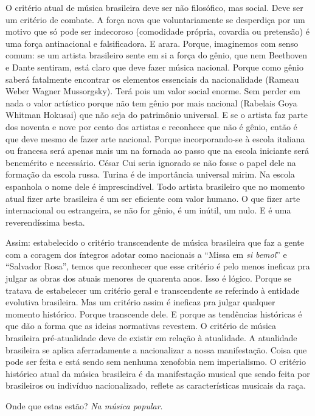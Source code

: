 O critério atual de música brasileira deve ser não filosófico, mas
social. Deve ser um critério de combate. A força nova que
voluntariamente se desperdiça por um motivo que só pode ser indecoroso
(comodidade própria, covardia ou pretensão) é uma força antinacional e
falsificadora. E arara. Porque, imaginemos com senso comum: se um
artista brasileiro sente em si a força do gênio, que nem Beethoven e
Dante sentiram, está claro que deve fazer música nacional. Porque como
gênio saberá fatalmente encontrar os elementos essenciais da
nacionalidade (Rameau Weber Wagner Mussorgsky). Terá pois um valor
social enorme. Sem perder em nada o valor artístico porque não tem gênio
por mais nacional (Rabelais Goya Whitman Hokusai) que não seja do
patrimônio universal. E se o artista faz parte dos noventa e nove por cento dos
artistas e reconhece que não é gênio, então é que deve mesmo de fazer
arte nacional. Porque incorporando-se à escola italiana ou francesa será
apenas mais um na fornada ao passo que na escola iniciante será
benemérito e necessário. César Cui seria ignorado se não fosse o papel
dele na formação da escola russa. Turina é de importância universal
mirim. Na escola espanhola o nome dele é imprescindível. Todo artista
brasileiro que no momento atual fizer arte brasileira é um ser eficiente
com valor humano. O que fizer arte internacional ou estrangeira, se não
for gênio, é um inútil, um nulo. E é uma reverendíssima besta.

Assim: estabelecido o critério transcendente de música brasileira que
faz a gente com a coragem dos íntegros adotar como nacionais a ``Missa em
\textit{si bemol}'' e ``Salvador Rosa'', temos que reconhecer que esse critério é pelo
menos ineficaz pra julgar as obras dos atuais menores de quarenta anos.
Isso é lógico. Porque se tratava de estabelecer um critério geral e
transcendente se referindo à entidade evolutiva brasileira. Mas um
critério assim é ineficaz pra julgar qualquer momento histórico. Porque
transcende dele. E porque as tendências históricas é que dão a forma que
as ideias normativas revestem. O critério de música brasileira
pré-atualidade deve de existir em relação à atualidade. A atualidade
brasileira se aplica aferradamente a nacionalizar a nossa manifestação.
Coisa que pode ser feita e está sendo sem nenhuma xenofobia nem
imperialismo. O critério histórico atual da música brasileira é da
manifestação musical que sendo feita por brasileiros ou indivíduo
nacionalizado, reflete as características musicais da raça.

Onde que estas estão? \textit{Na música popular}.

